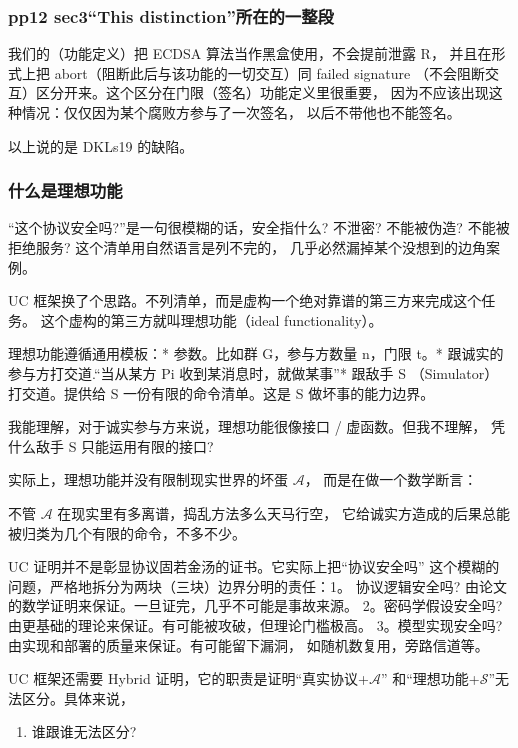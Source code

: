 \subsubsection{pp12 sec3“This distinction”所在的一整段}

我们的（功能定义）把 ECDSA 算法当作黑盒使用，不会提前泄露 R，
并且在形式上把 abort（阻断此后与该功能的一切交互）同 failed signature
（不会阻断交互）区分开来。这个区分在门限（签名）功能定义里很重要，
因为不应该出现这种情况：仅仅因为某个腐败方参与了一次签名，
以后不带他也不能签名。

以上说的是 DKLs19 的缺陷。

\subsubsection{什么是理想功能}

“这个协议安全吗?”是一句很模糊的话，安全指什么? 不泄密? 不能被伪造?
不能被拒绝服务? 这个清单用自然语言是列不完的，
几乎必然漏掉某个没想到的边角案例。

UC 框架换了个思路。不列清单，而是虚构一个绝对靠谱的第三方来完成这个任务。
这个虚构的第三方就叫理想功能（ideal functionality）。

理想功能遵循通用模板：* 参数。比如群 G，参与方数量 n，门限 t。*
跟诚实的参与方打交道.“当从某方 Pi 收到某消息时，就做某事”* 跟敌手 S
（Simulator）打交道。提供给 S 一份有限的命令清单。这是 S
做坏事的能力边界。

我能理解，对于诚实参与方来说，理想功能很像接口 / 虚函数。但我不理解，
凭什么敌手 S 只能运用有限的接口?

实际上，理想功能并没有限制现实世界的坏蛋 $\mathcal{A}$，
而是在做一个数学断言：

不管 $\mathcal{A}$ 在现实里有多离谱，捣乱方法多么天马行空，
它给诚实方造成的后果总能被归类为几个有限的命令，不多不少。

UC 证明并不是彰显协议固若金汤的证书。它实际上把“协议安全吗”
这个模糊的问题，严格地拆分为两块（三块）边界分明的责任：1。
协议逻辑安全吗? 由论文的数学证明来保证。一旦证完，几乎不可能是事故来源。
2。密码学假设安全吗? 由更基础的理论来保证。有可能被攻破，但理论门槛极高。
3。模型实现安全吗? 由实现和部署的质量来保证。有可能留下漏洞，
如随机数复用，旁路信道等。

UC 框架还需要 Hybrid 证明，它的职责是证明“真实协议+$\mathcal{A}$”
和“理想功能+$\mathcal{S}$”无法区分。具体来说，

\begin{enumerate}
\def\labelenumi{(\arabic{enumi})}

\item
  谁跟谁无法区分?
\end{enumerate}

